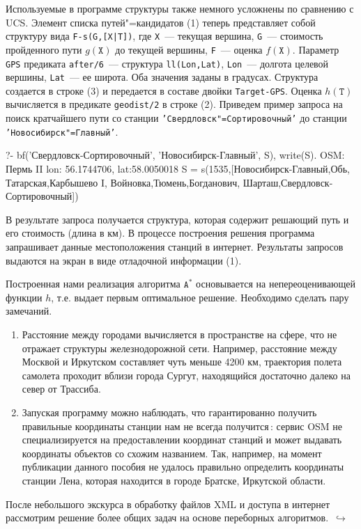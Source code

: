 \documentclass[a4paper,14pt, openany, twoside, draft]{extbook} %
\newcommand{\aaa}[2][acolor]{\noindent\textcolor{eclr}%
{+\ [}\textcolor{#1}{#2}\textcolor{eclr}{]}}
\newcommand{\goforth}[1]{$\,\hookrightarrow$\pageref{#1}}
\begin{document}
Используемые в программе структуры также немного усложнены по сравнению с UCS.  Элемент списка путей"=кандидатов (1) теперь представляет собой структуру вида \texttt{F-s(G,[X|T])}, где \texttt{X}~--- текущая вершина, \texttt{G}~--- стоимость пройденного пути $g(\mathtt{X})$ до текущей вершины, \texttt{F}~--- оценка $f(\mathtt{X})$.  Параметр \texttt{GPS} предиката \texttt{after/6}~--- структура \texttt{ll(Lon,Lat)}, \texttt{Lon}~--- долгота целевой вершины, \texttt{Lat}~--- ее широта.   Оба значения заданы в градусах.  Структура создается в строке (3) и передается в составе двойки \texttt{Target-GPS}.  Оценка $h(\mathtt{T})$ вычисляется в предикате \texttt{geodist/2} в строке (2).  Приведем пример запроса на поиск кратчайшего пути со станции \texttt{'Свердловск"=Сортировочный'} до станции \texttt{'Новосибирск"=Главный'}.

\begin{proexp}
?- bf('Свердловск-Сортировочный',
   'Новосибирск-Главный', S), write(S).
OSM: Пермь II
    lon: 56.1744706, lat:58.0050018    %
S = s(1535,[Новосибирск-Главный,Обь,
    Татарская,Карбышево I,
    Войновка,Тюмень,Богданович,
    Шарташ,Свердловск-Сортировочный])
\end{proexp}


В результате запроса получается структура, которая содержит решающий путь и его стоимость (длина в км).  В процессе построения решения программа запрашивает данные местоположения станций в интернет.  Результаты запросов выдаются на экран в виде отладочной информации (1).


Построенная нами реализация алгоритма $\mathtt{A}^*$ основывается на непереоценивающей функции $h$, т.е. выдает первым оптимальное решение.  Необходимо сделать пару замечаний.
\begin{enumerate}
\item Расстояние между городами вычисляется в пространстве на сфере, что не отражает структуры железнодорожной сети.  Например, расстояние между Москвой и Иркутском составляет чуть меньше 4200 км,  траектория полета самолета проходит вблизи города Сургут, находящийся достаточно далеко на север от Трассиба.
\item Запуская программу можно наблюдать, что гарантированно получить правильные координаты станции нам не всегда получится\,: сервис OSM не специализируется на предоставлении координат станций и может выдавать координаты объектов со схожим названием.  Так, например, на момент публикации данного пособия не удалось правильно определить координаты станции Лена, которая находится в городе Братске, Иркутской области.
\end{enumerate}
После небольшого экскурса в обработку файлов XML и доступа в интернет рассмотрим решение более общих задач на основе переборных алгоритмов.  \goforth{sec:britmuseum}
\end{document}
